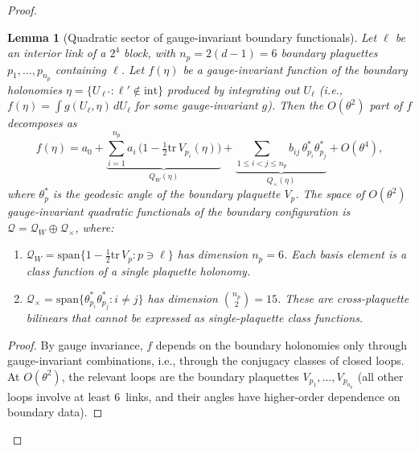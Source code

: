 \documentclass[11pt]{article}
\newtheorem{lemma}[theorem]{Lemma}
\theoremstyle{definition}
\newcommand{\tr}{\mathrm{tr}}
\begin{document}
\begin{proof}
\begin{lemma}[Quadratic sector of gauge-invariant boundary
functionals]\label{lem:quadratic-sector}
Let $\ell$ be an interior link of a $2^4$ block, with
$n_p=2(d{-}1)=6$ boundary plaquettes $p_1,\ldots,p_{n_p}$
containing $\ell$.  Let $f(\eta)$ be a gauge-invariant function
of the boundary holonomies $\eta=\{U_{\ell'}:\ell'\notin\mathrm{int}\}$
produced by integrating out $U_\ell$ (i.e.,
$f(\eta)=\int g(U_\ell,\eta)\,dU_\ell$ for some gauge-invariant $g$).
Then the $O(\theta^2)$ part of $f$ decomposes as
\begin{equation}\label{eq:Q-decomp}
f(\eta)=a_0+\underbrace{\sum_{i=1}^{n_p}a_i\,
\bigl(1-\tfrac{1}{2}\tr\,V_{p_i}(\eta)\bigr)}
_{\displaystyle Q_W(\eta)}
+\underbrace{\sum_{1\le i<j\le n_p}
b_{ij}\,\theta_{p_i}^*\theta_{p_j}^*}
_{\displaystyle Q_\times(\eta)}
+O(\theta^4),
\end{equation}
where $\theta_p^*$ is the geodesic angle of the boundary plaquette
$V_p$.  The space of $O(\theta^2)$ gauge-invariant quadratic
functionals of the boundary configuration is
$\mathcal{Q}=\mathcal{Q}_W\oplus\mathcal{Q}_\times$,
where:
\begin{enumerate}[nosep,label=(\roman*)]
\item $\mathcal{Q}_W=\mathrm{span}\{1-\frac{1}{2}\tr\,V_p:
p\ni\ell\}$ has dimension $n_p=6$.  Each basis element
is a class function of a single plaquette holonomy.
\item $\mathcal{Q}_\times=\mathrm{span}\{\theta_{p_i}^*
\theta_{p_j}^*:i\ne j\}$ has dimension
$\binom{n_p}{2}=15$.  These are cross-plaquette bilinears
that cannot be expressed as single-plaquette class functions.
\end{enumerate}
\end{lemma}

\begin{proof}
By gauge invariance, $f$ depends on the boundary holonomies
only through gauge-invariant combinations, i.e., through the
conjugacy classes of closed loops.  At $O(\theta^2)$,
the relevant loops are the boundary plaquettes $V_{p_1},\ldots,
V_{p_{n_p}}$ (all other loops involve at least 6~links, and
their angles have higher-order dependence on boundary data).


\end{proof}
\end{proof}
\end{document}
